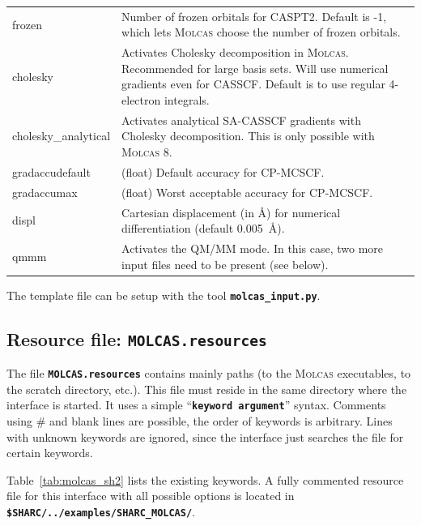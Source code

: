 \documentclass[a4paper,10pt,DIV=15,openany,twoside=false]{scrbook}
\newcommand{\ttt}[1]{\textbf{\texttt{#1}}}
\begin{document}
\begin{table}
\begin{tabular}{>{\ttfamily}lp{12cm}}
frozen          &Number of frozen orbitals for CASPT2. Default is -1, which lets \textsc{Molcas} choose the number of frozen orbitals.\\
cholesky        &Activates Cholesky decomposition in \textsc{Molcas}. Recommended for large basis sets. Will use numerical gradients even for CASSCF. Default is to use regular 4-electron integrals.\\
cholesky\_analytical    &Activates analytical SA-CASSCF gradients with Cholesky decomposition. This is only possible with \textsc{Molcas} 8.\\
gradaccudefault &(float) Default accuracy for CP-MCSCF.\\
gradaccumax     &(float) Worst acceptable accuracy for CP-MCSCF.\\
displ           &Cartesian displacement (in \AA) for numerical differentiation (default 0.005~\AA).\\
qmmm            &Activates the QM/MM mode. In this case, two more input files need to be present (see below).\\
  \bottomrule
  \end{tabular}
\end{table}

The template file can be setup with the tool \ttt{molcas\_input.py}.


\subsection{Resource file: \ttt{MOLCAS.resources}}

The file \ttt{MOLCAS.resources} contains mainly paths (to the \textsc{Molcas} executables, to the scratch directory, etc.). This file must reside in the same directory where the interface is started. It uses a simple ``\ttt{keyword argument}'' syntax. Comments using \# and blank lines are possible, the order of keywords is arbitrary. Lines with unknown keywords are ignored, since the interface just searches the file for certain keywords.

Table~\ref{tab:molcas_sh2} lists the existing keywords.
A fully commented resource file for this interface with all possible options is located in \ttt{\$SHARC/../examples/SHARC\_MOLCAS/}.
\end{document}
